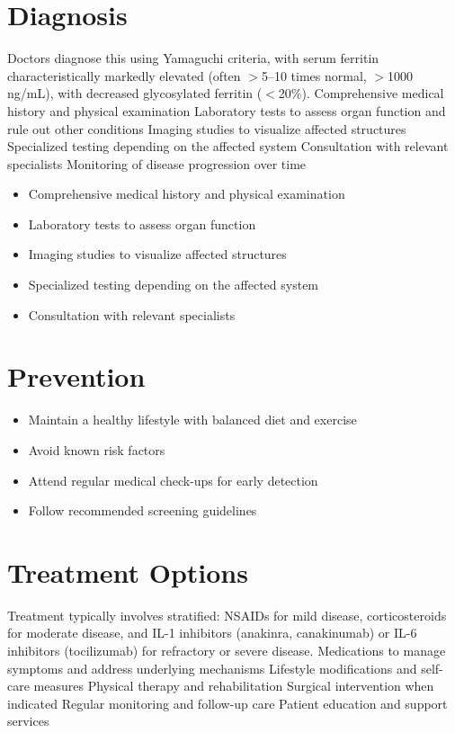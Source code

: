 \section{Diagnosis}
Doctors diagnose this using Yamaguchi criteria, with serum ferritin characteristically markedly elevated (often $>$5--10 times normal, $>$1000 ng/mL), with decreased glycosylated ferritin ($<$20\%). Comprehensive medical history and physical examination Laboratory tests to assess organ function and rule out other conditions Imaging studies to visualize affected structures Specialized testing depending on the affected system Consultation with relevant specialists Monitoring of disease progression over time

\begin{itemize}[noitemsep]
  \item Comprehensive medical history and physical examination
  \item Laboratory tests to assess organ function
  \item Imaging studies to visualize affected structures
  \item Specialized testing depending on the affected system
  \item Consultation with relevant specialists
\end{itemize}
\section{Prevention}
\begin{itemize}[noitemsep]
  \item Maintain a healthy lifestyle with balanced diet and exercise
  \item Avoid known risk factors
  \item Attend regular medical check-ups for early detection
  \item Follow recommended screening guidelines
\end{itemize}
\section{Treatment Options}
Treatment typically involves stratified: NSAIDs for mild disease, corticosteroids for moderate disease, and IL-1 inhibitors (anakinra, canakinumab) or IL-6 inhibitors (tocilizumab) for refractory or severe disease. Medications to manage symptoms and address underlying mechanisms Lifestyle modifications and self-care measures Physical therapy and rehabilitation Surgical intervention when indicated Regular monitoring and follow-up care Patient education and support services

